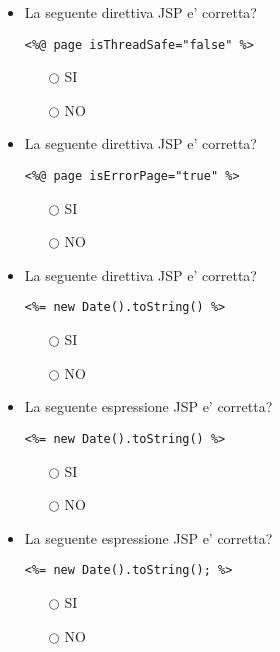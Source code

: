 \documentclass[10pt,twocolumn]{article}
\begin{document}
\begin{itemize}
    \item La seguente direttiva JSP e' corretta?
          \begin{verbatim}
<%@ page isThreadSafe="false" %>
\end{verbatim}
          \begin{itemize}
              \item[$\bigcirc$] SI
              \item[$\bigcirc$] NO
          \end{itemize}
\end{itemize}
\begin{itemize}
    \item La seguente direttiva JSP e' corretta?
          \begin{verbatim}
<%@ page isErrorPage="true" %>
\end{verbatim}
          \begin{itemize}
              \item[$\bigcirc$] SI
              \item[$\bigcirc$] NO
          \end{itemize}
\end{itemize}
\begin{itemize}
    \item La seguente direttiva JSP e' corretta?
          \begin{verbatim}
<%= new Date().toString() %>
\end{verbatim}
          \begin{itemize}
              \item[$\bigcirc$] SI
              \item[$\bigcirc$] NO
          \end{itemize}
\end{itemize}
\begin{itemize}
    \item La seguente espressione JSP e' corretta?
          \begin{verbatim}
<%= new Date().toString() %>
\end{verbatim}
          \begin{itemize}
              \item[$\bigcirc$] SI
              \item[$\bigcirc$] NO
          \end{itemize}
\end{itemize}
\begin{itemize}
    \item La seguente espressione JSP e' corretta?
          \begin{verbatim}
<%= new Date().toString(); %>
\end{verbatim}
          \begin{itemize}
              \item[$\bigcirc$] SI
              \item[$\bigcirc$] NO
          \end{itemize}
\end{itemize}
\end{document}

